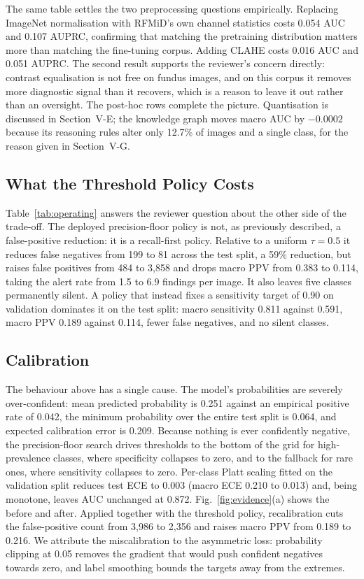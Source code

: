 \documentclass[11pt]{IEEEtran}
\begin{document}
The same table settles the two preprocessing questions empirically. Replacing ImageNet
normalisation with RFMiD's own channel statistics costs 0.054 AUC and 0.107 AUPRC, confirming
that matching the pretraining distribution matters more than matching the fine-tuning corpus.
Adding CLAHE costs 0.016 AUC and 0.051 AUPRC. The second result supports the reviewer's concern
directly: contrast equalisation is not free on fundus images, and on this corpus it removes more
diagnostic signal than it recovers, which is a reason to leave it out rather than an oversight.
The post-hoc rows complete the picture. Quantisation is discussed in Section~V-E; the knowledge
graph moves macro AUC by $-0.0002$ because its reasoning rules alter only 12.7\% of images and a
single class, for the reason given in Section~V-G.



\subsection{What the Threshold Policy Costs}
Table~\ref{tab:operating} answers the reviewer question about the other side of the trade-off. The
deployed precision-floor policy is not, as previously described, a false-positive reduction: it is
a recall-first policy. Relative to a uniform $\tau{=}0.5$ it reduces false negatives from 199 to 81
across the test split, a 59\% reduction, but raises false positives from 484 to 3{,}858 and drops
macro PPV from 0.383 to 0.114, taking the alert rate from 1.5 to 6.9 findings per image. It also
leaves five classes permanently silent. A policy that instead fixes a sensitivity target of 0.90
on validation dominates it on the test split: macro sensitivity 0.811 against 0.591, macro PPV
0.189 against 0.114, fewer false negatives, and no silent classes.



\subsection{Calibration}
The behaviour above has a single cause. The model's probabilities are severely over-confident:
mean predicted probability is 0.251 against an empirical positive rate of 0.042, the minimum
probability over the entire test split is 0.064, and expected calibration error is 0.209. Because
nothing is ever confidently negative, the precision-floor search drives thresholds to the bottom
of the grid for high-prevalence classes, where specificity collapses to zero, and to the fallback
for rare ones, where sensitivity collapses to zero. Per-class Platt scaling fitted on the
validation split reduces test ECE to 0.003 (macro ECE 0.210 to 0.013) and, being monotone, leaves
AUC unchanged at 0.872. Fig.~\ref{fig:evidence}(a) shows the before and after. Applied together
with the threshold policy, recalibration cuts the false-positive count from 3{,}986 to 2{,}356 and
raises macro PPV from 0.189 to 0.216. We attribute the miscalibration to the asymmetric loss:
probability clipping at 0.05 removes the gradient that would push confident negatives towards
zero, and label smoothing bounds the targets away from the extremes.
\end{document}
